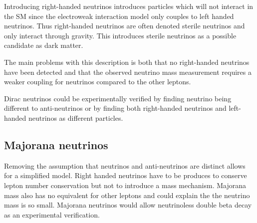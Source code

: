 Introducing right-handed neutrinos introduces particles which will not interact in the SM since the electroweak interaction model only couples to left handed neutrinos. Thus right-handed neutrinos are often denoted sterile neutrinos and only interact through gravity. This introduces sterile neutrinos as a possible candidate as dark matter. \cite{SterileDark, SUSYdark}

The main problems with this description is both that no right-handed neutrinos have been detected and that the observed neutrino mass measurement requires a weaker coupling for neutrinos compared to the other leptons.

Dirac neutrinos could be experimentally verified by finding neutrino being different to anti-neutrinos or by finding both right-handed neutrinos and left-handed neutrinos as different particles.

\subsection{Majorana neutrinos}
Removing the assumption that neutrinos and anti-neutrinos are distinct allows for a simplified model. Right handed neutrinos have to be produces to conserve lepton number conservation but not to introduce a mass mechanism. Majorana mass also has no equivalent for other leptons and could explain the the neutrino mass is so small. Majorana neutrinos would allow neutrinoless double beta decay\cite{NeuLess} as an experimental verification.


%
